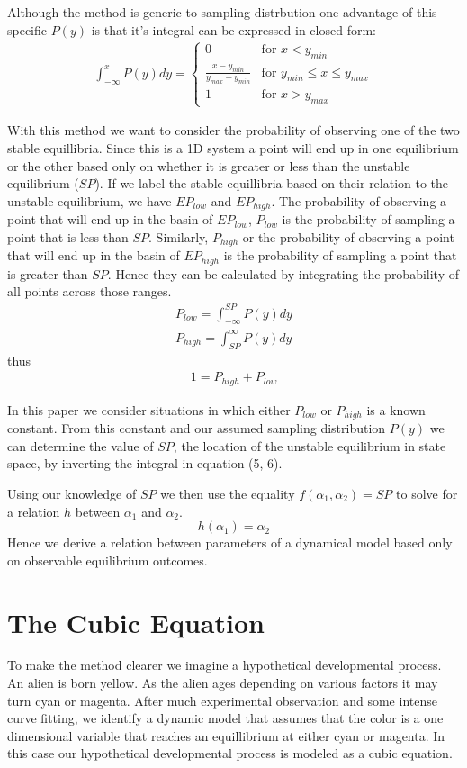 \documentclass[letterpaper]{article}
\begin{document}
Although the method is generic to sampling distrbution one advantage of this specific
$P(y)$ is that it's integral can be expressed in closed form:
\begin{eqnarray}
  \int_{-\infty}^{x} P(y) dy = 
  \begin{cases}
        0 & \text{for } x < y_{min}\\
        \frac{x-y_{min}}{y_{max} - y_{min}} & \text{for } y_{min}\leq x\leq y_{max}\\
        1 & \text{for } x > y_{max}
  \end{cases}
\end{eqnarray}

With this method we want to consider the probability of observing one of the 
two stable equillibria. Since this is a 1D system a point will end up in one equilibrium
or the other based only on whether it is greater or less than the unstable equilibrium
($SP$).
If we label the stable equillibria based on their relation to the unstable equilibrium,
we have $EP_{low}$ and $EP_{high}$. The probability of observing a point that will end 
up 
in the basin of $EP_{low}$, $P_{low}$ is the probability of sampling a point that is 
less than $SP$. Similarly, $P_{high}$ or the probability of observing a point that 
will end up in the basin of $EP_{high}$ is the probability of sampling a point that is 
greater than $SP$. Hence they can be calculated by integrating the probability of
all points across those ranges.
\begin{eqnarray}
  P_{low} = \int_{-\infty}^{SP} P(y)dy\\
  P_{high} = \int^{\infty}_{SP} P(y)dy
\end{eqnarray}
  thus
\begin{eqnarray}
    1 = P_{high} + P_{low}
\end{eqnarray}

In this paper we consider situations in which either $P_{low}$ or $P_{high}$ is a 
known constant. From this constant and our assumed sampling distribution $P(y)$ we 
can determine the value of $SP$, the location of the unstable equilibrium in 
state space, by inverting the integral in equation (5, 6).

Using our knowledge of $SP$ we then use the equality $f(\alpha_1,\alpha_2) = SP$ to
solve for a relation $h$ between $\alpha_1$ and $\alpha_2$.
\[
  h(\alpha_1) = \alpha_2
  \]
Hence we derive a relation between parameters of a dynamical model based only on 
observable equilibrium outcomes.

\section{The Cubic Equation}
To make the method clearer we imagine a hypothetical developmental
process. An alien is born yellow. As the alien ages depending
on various factors it may turn cyan or magenta. After much experimental observation
and some intense curve fitting, we identify a dynamic
model that assumes that the color is a one dimensional variable that reaches 
an equillibrium at either cyan or magenta. In this case our hypothetical developmental
process is modeled as a cubic equation.
\end{document}
